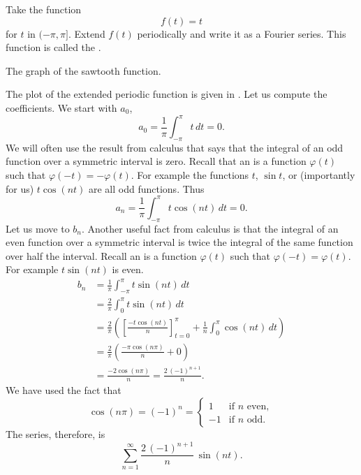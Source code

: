 \begin{example}
Take the function
\begin{equation*}
f(t) = t
\end{equation*}
for $t$ in $(-\pi,\pi]$.  Extend $f(t)$ periodically and write it 
as a Fourier series.  This function is called the \emph{}.

\begin{myfig}
\capstart
{}
\caption{The graph of the sawtooth function.\label{ts:sawtoothfig}}
\end{myfig}

The plot of the extended periodic function is given in
.
Let us compute the coefficients.  We start with $a_0$,
\begin{equation*}
a_0 = \frac{1}{\pi} \int_{-\pi}^\pi t \,dt = 0 .
\end{equation*}
We will often use the result from calculus that says that the integral of an odd
function over a symmetric interval is zero.  Recall that an
\emph{} is a
function $\varphi(t)$ such that $\varphi(-t) = -\varphi(t)$.  For example
the functions $t$, $\sin t$, or (importantly for us)
$t \cos (nt)$ are all odd functions.  Thus
\begin{equation*}
a_n = \frac{1}{\pi} \int_{-\pi}^\pi t \cos (nt) \,dt = 0 .
\end{equation*}
Let us move to $b_n$.  Another useful fact from calculus
is that the integral of an even function over
a symmetric interval is
twice the integral of the same function over half the interval.  
Recall an \emph{}
is a
function $\varphi(t)$ such that $\varphi(-t) = \varphi(t)$.  For example
$t \sin (nt)$ is even.
\begin{equation*}
\begin{split}
b_n & = \frac{1}{\pi} \int_{-\pi}^\pi t \sin (nt) \,dt \\
& = \frac{2}{\pi} \int_{0}^\pi t \sin (nt) \,dt \\
& = \frac{2}{\pi} \left(
\left[ \frac{-t \cos (nt)}{n} \right]_{t=0}^{\pi}
+
\frac{1}{n}
\int_{0}^\pi \cos (nt) \,dt
\right)
\\
& = \frac{2}{\pi} \left(
\frac{-\pi \cos (n\pi)}{n}
+
0
\right) \\
& =  \frac{-2 \cos (n\pi)}{n}
=  \frac{2 \,{(-1)}^{n+1}}{n} .
\end{split}
\end{equation*}
We have used the fact that 
\begin{equation*}
\cos (n\pi) = {(-1)}^n =
\begin{cases}
1 & \text{if } n \text{ even} , \\
-1 & \text{if } n \text{ odd} .
\end{cases}
\end{equation*}
The series, therefore, is
\begin{equation*}
\sum_{n=1}^\infty
\frac{2 \,{(-1)}^{n+1}}{n} \,
\sin (n t) .
\end{equation*}


\end{example}
